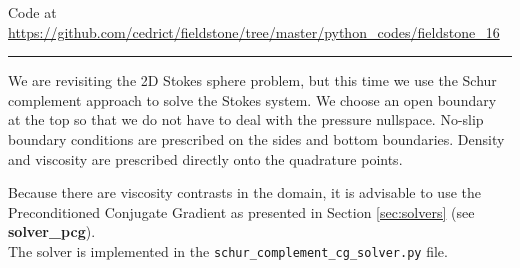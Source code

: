 

\begin{center}
Code at \url{https://github.com/cedrict/fieldstone/tree/master/python_codes/fieldstone_16}
\end{center}

\par\noindent\rule{\textwidth}{0.4pt}


We are revisiting the 2D Stokes sphere problem, but this time 
we use the Schur complement approach to solve the Stokes system. 
We choose an open boundary at the top so that we do not have to deal with the pressure 
nullspace. No-slip boundary conditions are prescribed on the sides and bottom boundaries.
Density and viscosity are prescribed directly onto the quadrature points. 

Because there are viscosity contrasts in the domain, it is advisable 
to use the Preconditioned Conjugate Gradient 
as presented in Section \ref{sec:solvers} (see {\bf solver\_pcg}).\\
The solver is implemented in the {\tt schur\_complement\_cg\_solver.py} file.  

